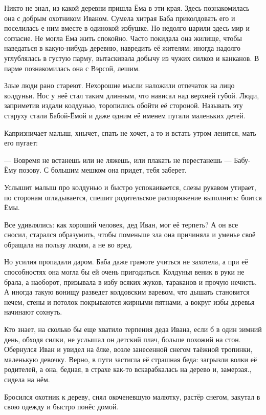 \documentclass[oneside,final,14pt]{extreport}
\begin{document}
		Никто не знал, из какой деревни пришла Ёма в эти края. Здесь познакомилась она с добрым охотником Иваном. Сумела хитрая Баба приколдовать его и поселилась е ним вместе в одинокой избушке. Но недолго царили здесь мир и согласие. Не могла Ёма жить спокойно. Часто покидала она жилище, чтобы наведаться в какую-нибудь деревню, навредить её жителям; иногда надолго углублялась в густую парму, вытаскивала добычу из чужих силков и канканов. В парме познакомилась она с Вэрсой, лешим.
		
		Злые люди рано стареют. Нехорошие мысли наложили отпечаток на лицо колдуньи. Нос у неё стал таким длинным, что нависал над верхней губой. Люди, заприметив издали колдунью, торопились обойти её стороной. Называть эту старуху стали Бабой-Ёмой и даже одним её именем пугали маленьких детей.
		
		Капризничает малыш, хнычет, спать не хочет, а то и встать утром ленится, мать его пугает:
		
		— Вовремя не встанешь или не ляжешь, или плакать не перестанешь — Бабу-Ёму позову. С большим мешком она придет, тебя заберет.
		
		Услышит малыш про колдунью и быстро успокаивается, слезы рукавом утирает, по сторонам оглядывается, спешит родительское распоряжение выполнить: боится Ёмы.
		
		Все удивлялись: как хороший человек, дед Иван, мог её терпеть? А он все сносил, старался образумить, чтобы поменьше зла она причиняла и уменье своё обращала на пользу людям, а не во вред.
		
		Но усилия пропадали даром. Баба даже грамоте учиться не захотела, а при её способностях она могла бы ей очень пригодиться. Колдунья веник в руки не брала, а наоборот, призывала в избу всяких жуков, тараканов и прочую нечисть. А иногда такую вонищу разведет колдовским варевом, что дышать становится нечем, стены и потолок покрываются жирными пятнами, а вокруг избы деревья начинают сохнуть.
		
		Кто знает, на сколько бы еще хватило терпения деда Ивана, если б в один зимний день, обходя силки, не услышал он детский плач, больше похожий на стон. Обернулся Иван и увидел на ёлке, возле занесенной снегом таёжной тропинки, маленькую девочку. Верно, в пути застигла её страшная беда: загрызли волки её родителей, а она, бедная, в страхе как-то вскарабкалась на дерево и, замерзая., сидела на нём.
		
		Бросился охотник к дереву, снял окоченевшую малютку, растёр снегом, закутал в свою одежду и быстро понёс домой.
		
\end{document}
